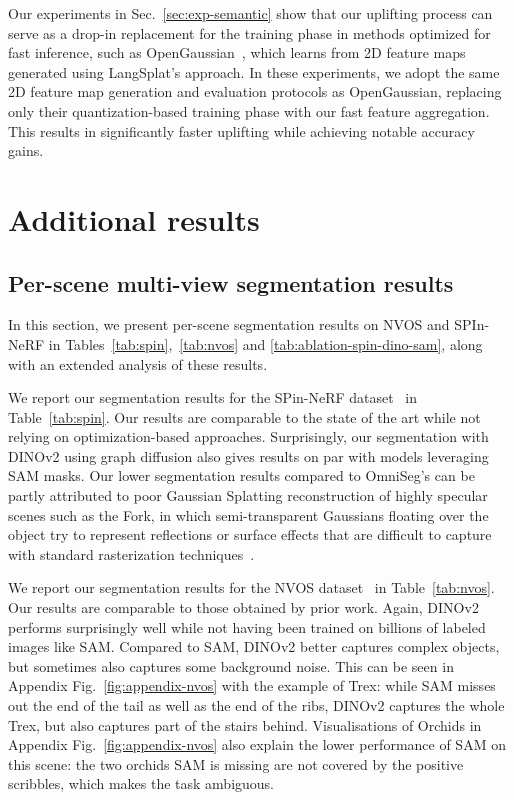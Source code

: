 Our experiments in Sec.~\ref{sec:exp-semantic} show that our uplifting process can serve as a drop-in replacement for the training phase in methods optimized for fast inference, such as OpenGaussian~\citep{wu2024opengaussian}, which learns from 2D feature maps generated using LangSplat’s approach. In these experiments, we adopt the same 2D feature map generation and evaluation protocols as OpenGaussian, replacing only their quantization-based training phase with our fast feature aggregation. This results in significantly faster uplifting while achieving notable accuracy gains.





\section{Additional results}

\subsection{Per-scene multi-view segmentation results}
\label{sec:appendix-seg_scene}

In this section, we present per-scene segmentation results on NVOS and SPIn-NeRF in Tables~\ref{tab:spin},~\ref{tab:nvos} and \ref{tab:ablation-spin-dino-sam}, along with an extended analysis of these results.

We report our segmentation results for the SPin-NeRF dataset~\citep{mirzaei2023spin} in Table~\ref{tab:spin}.
Our results are comparable to the state of the art while not relying on optimization-based approaches. Surprisingly, our segmentation with DINOv2 using graph diffusion also gives results on par with models leveraging SAM masks. 
Our lower segmentation results compared to OmniSeg's can be partly attributed to poor Gaussian Splatting reconstruction of highly specular scenes such as the Fork, in which semi-transparent Gaussians floating over the object try to represent reflections or surface effects that are difficult to capture with standard rasterization techniques~\citep{jiang2024gaussianshader}.

We report our segmentation results for the NVOS dataset~\citep{ren2022nvos} in Table~\ref{tab:nvos}. 
Our results are comparable to those obtained by prior work. Again, DINOv2 performs surprisingly well while not having been trained on billions of labeled images like SAM. Compared to SAM, DINOv2 better captures complex objects, but sometimes also captures some background noise. This can be seen in Appendix Fig.~\ref{fig:appendix-nvos} with the example of Trex: while SAM misses out the end of the tail as well as the end of the ribs, DINOv2 captures the whole Trex, but also captures part of the stairs behind. Visualisations of Orchids in Appendix Fig.~\ref{fig:appendix-nvos} also explain the lower performance of SAM on this scene: the two orchids SAM is missing are not covered by the positive scribbles, which makes the task ambiguous.

